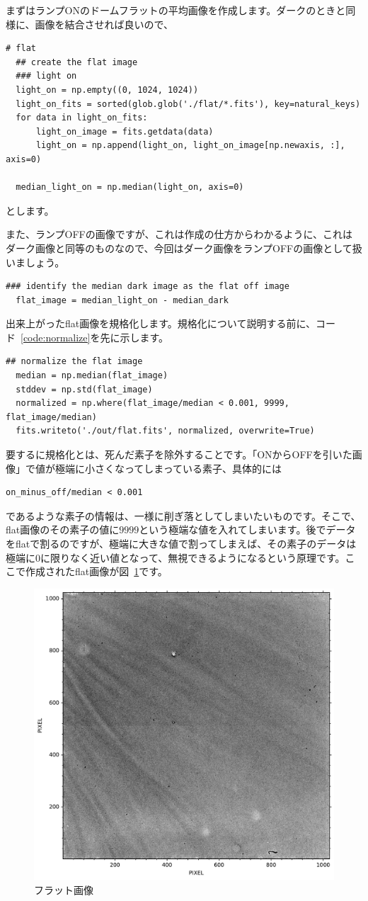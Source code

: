 まずはランプONのドームフラットの平均画像を作成します。ダークのときと同様に、画像を結合させれば良いので、
\begin{lstlisting}[caption=ランプONのフラット画像, label=code:flat_light_on]
  # flat
  ## create the flat image
  ### light on
  light_on = np.empty((0, 1024, 1024))
  light_on_fits = sorted(glob.glob('./flat/*.fits'), key=natural_keys)
  for data in light_on_fits:
      light_on_image = fits.getdata(data)
      light_on = np.append(light_on, light_on_image[np.newaxis, :], axis=0)

  median_light_on = np.median(light_on, axis=0)
\end{lstlisting}
とします。

また、ランプOFFの画像ですが、これは作成の仕方からわかるように、これはダーク画像と同等のものなので、今回はダーク画像をランプOFFの画像として扱いましょう。
\begin{lstlisting}[caption=ランプOFFのフラット画像とフラット画像の作成, label=code:flat_light_off]
  ### identify the median dark image as the flat off image
  flat_image = median_light_on - median_dark
\end{lstlisting}

出来上がったflat画像を規格化します。規格化について説明する前に、コード~\ref{code:normalize}を先に示します。
\begin{lstlisting}[caption=フラット画像の規格化,label=code:flatted]
  ## normalize the flat image
  median = np.median(flat_image)
  stddev = np.std(flat_image)
  normalized = np.where(flat_image/median < 0.001, 9999, flat_image/median)
  fits.writeto('./out/flat.fits', normalized, overwrite=True)
\end{lstlisting}
要するに規格化とは、死んだ素子を除外することです。「ONからOFFを引いた画像」で値が極端に小さくなってしまっている素子、具体的には
\begin{verbatim}on_minus_off/median < 0.001\end{verbatim}
であるような素子の情報は、一様に削ぎ落としてしまいたいものです。そこで、flat画像のその素子の値に$9999$という極端な値を入れてしまいます。後でデータをflatで割るのですが、極端に大きな値で割ってしまえば、その素子のデータは極端に0に限りなく近い値となって、無視できるようになるという原理です。ここで作成されたflat画像が図~\ref{fig:flat}です。
\begin{figure}
  \centering
	\includegraphics[width=0.6\linewidth]{./fig/chap_5/flat_fits.pdf}
	\caption{フラット画像}
  \label{fig:flat}
\end{figure}

